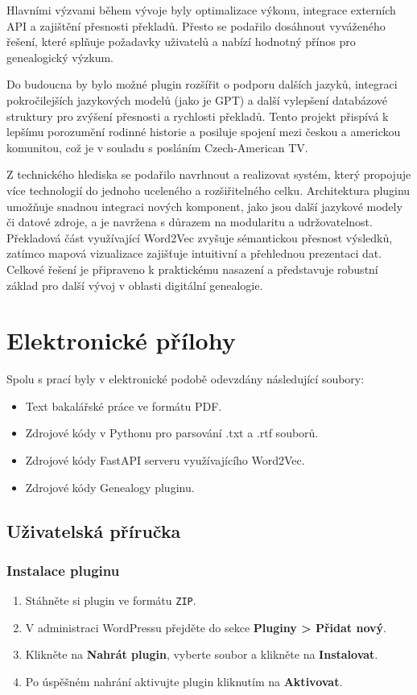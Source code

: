 \documentclass[czech, ba, kiv, he]{fasthesis}
\begin{document}
Hlavními výzvami během vývoje byly optimalizace výkonu, integrace externích API a zajištění přesnosti překladů. Přesto se podařilo dosáhnout vyváženého řešení, které splňuje požadavky uživatelů a nabízí hodnotný přínos pro genealogický výzkum.

Do budoucna by bylo možné plugin rozšířit o podporu dalších jazyků, integraci pokročilejších jazykových modelů (jako je GPT) a další vylepšení databázové struktury pro zvýšení přesnosti a rychlosti překladů. Tento projekt přispívá k lepšímu porozumění rodinné historie a posiluje spojení mezi českou a americkou komunitou, což je v souladu s posláním Czech-American TV.

Z technického hlediska se podařilo navrhnout a realizovat systém, který propojuje více technologií do jednoho uceleného a rozšiřitelného celku. Architektura pluginu umožňuje snadnou integraci nových komponent, jako jsou další jazykové modely či datové zdroje, a je navržena s důrazem na modularitu a udržovatelnost. Překladová část využívající Word2Vec zvyšuje sémantickou přesnost výsledků, zatímco mapová vizualizace zajišťuje intuitivní a přehlednou prezentaci dat. Celkové řešení je připraveno k praktickému nasazení a představuje robustní základ pro další vývoj v oblasti digitální genealogie.


\chapter{Elektronické přílohy}
Spolu s prací byly v elektronické podobě odevzdány následující soubory:
\begin{itemize}
\item Text bakalářské práce ve formátu PDF.
\item Zdrojové kódy v Pythonu pro parsování .txt a .rtf souborů.
\item Zdrojové kódy FastAPI serveru využívajícího Word2Vec.
\item Zdrojové kódy Genealogy pluginu.
\end{itemize}
\newpage
\section{Uživatelská příručka}

\subsection{Instalace pluginu}

\begin{enumerate}
    \item Stáhněte si plugin ve formátu \texttt{ZIP}.
    \item V administraci WordPressu přejděte do sekce \textbf{Pluginy > Přidat nový}.
    \item Klikněte na \textbf{Nahrát plugin}, vyberte soubor a klikněte na \textbf{Instalovat}.
    \item Po úspěšném nahrání aktivujte plugin kliknutím na \textbf{Aktivovat}.
\end{enumerate}
\end{document}
